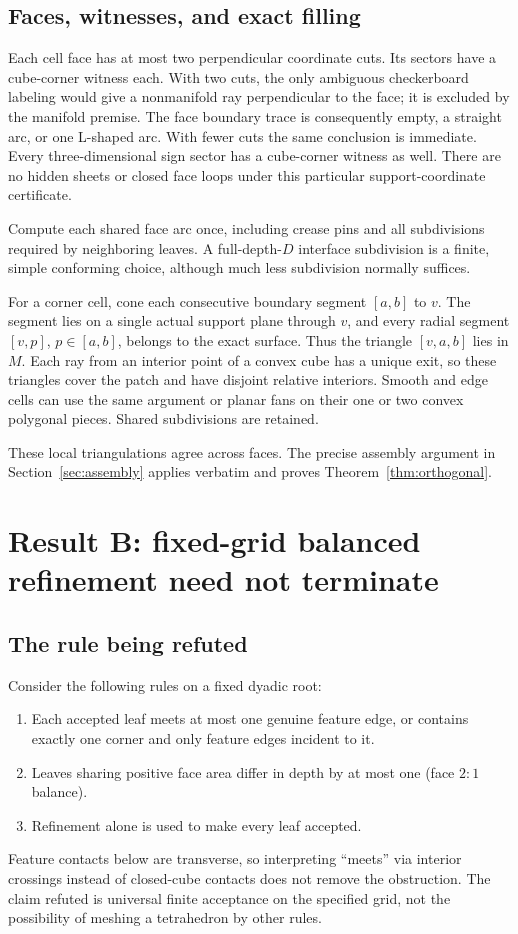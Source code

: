 \documentclass[11pt]{article}
\theoremstyle{definition}
\theoremstyle{remark}
\begin{document}
\subsection{Faces, witnesses, and exact filling}

Each cell face has at most two perpendicular coordinate cuts. Its sectors
have a cube-corner witness each. With two cuts, the only ambiguous
checkerboard labeling would give a nonmanifold ray perpendicular to the
face; it is excluded by the manifold premise. The face boundary trace
is consequently empty, a straight arc, or one L-shaped arc. With fewer
cuts the same conclusion is immediate. Every three-dimensional sign
sector has a cube-corner witness as well. There are no hidden sheets or
closed face loops under this particular support-coordinate certificate.

Compute each shared face arc once, including crease pins and all
subdivisions required by neighboring leaves. A full-depth-$D$ interface
subdivision is a finite, simple conforming choice, although much less
subdivision normally suffices.

For a corner cell, cone each consecutive boundary segment $[a,b]$ to
$v$. The segment lies on a single actual support plane through $v$,
and every radial segment $[v,p]$, $p\in[a,b]$, belongs to the exact
surface. Thus the triangle $[v,a,b]$ lies in $M$. Each ray from an
interior point of a convex cube has a unique exit, so these triangles
cover the patch and have disjoint relative interiors. Smooth and edge
cells can use the same argument or planar fans on their one or two
convex polygonal pieces. Shared subdivisions are retained.

These local triangulations agree across faces. The precise assembly
argument in Section~\ref{sec:assembly} applies verbatim and proves
Theorem~\ref{thm:orthogonal}.

\section{Result B: fixed-grid balanced refinement need not terminate}
\label{sec:obstruction}

\subsection{The rule being refuted}

Consider the following rules on a fixed dyadic root:
\begin{enumerate}[label=(\roman*)]
\item Each accepted leaf meets at most one genuine feature edge, or
  contains exactly one corner and only feature edges incident to it.
\item Leaves sharing positive face area differ in depth by at most one
  (face $2{:}1$ balance).
\item Refinement alone is used to make every leaf accepted.
\end{enumerate}
Feature contacts below are transverse, so interpreting ``meets'' via
interior crossings instead of closed-cube contacts does not remove the
obstruction. The claim refuted is universal finite acceptance on the
specified grid, not the possibility of meshing a tetrahedron by other rules.
\end{document}
